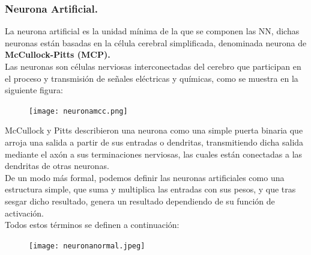 \documentclass[a4paper,10pt]{article}
\begin{document}
\subsubsection{Neurona Artificial.}
La neurona artificial es la unidad mínima de la que se componen las NN, dichas neuronas están basadas en la célula cerebral simplificada, denominada neurona de \textbf{McCullock-Pitts (MCP).}\\ Las neuronas son células nerviosas interconectadas del cerebro que participan en el proceso y transmisión de señales eléctricas y químicas, como se muestra en la siguiente figura: \\
\begin{figure}[H]
\centering
\texttt{[image: neuronamcc.png]}
\end{figure}
\noindent
McCullock y Pitts describieron una neurona como una simple puerta binaria que arroja una salida a partir de sus entradas o dendritas, transmitiendo dicha salida mediante el axón a sus terminaciones nerviosas, las cuales están conectadas a las dendritas de otras neuronas.\\
De un modo más formal, podemos definir las neuronas artificiales como una estructura simple, que suma y multiplica las entradas con sus pesos, y que tras sesgar dicho resultado, genera un resultado dependiendo de su función de activación. \\Todos estos términos se definen a continuación:
\begin{figure}[H]
\centering
\texttt{[image: neuronanormal.jpeg]}
\end{figure}
\end{document}
